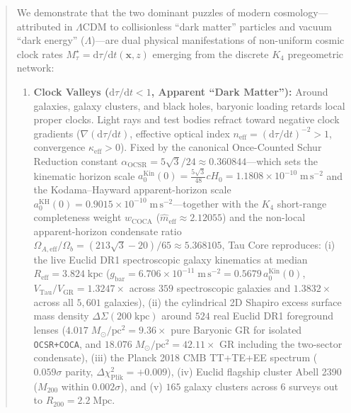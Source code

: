 \documentclass[11pt,a4paper]{article}
\begin{document}
\begin{abstract}
We demonstrate that the two dominant puzzles of modern cosmology---attributed in $\Lambda\mathrm{CDM}$ to collisionless ``dark matter'' particles and vacuum ``dark energy'' ($\Lambda$)---are dual physical manifestations of non-uniform cosmic clock rates $M_\tau^\star = \mathrm{d}\tau/\mathrm{d}t(\mathbf{x}, z)$ emerging from the discrete $K_4$ pregeometric network:
\begin{enumerate}
  \item \textbf{Clock Valleys ($\mathrm{d}\tau/\mathrm{d}t < 1$, Apparent ``Dark Matter''):} Around galaxies, galaxy clusters, and black holes, baryonic loading retards local proper clocks. Light rays and test bodies refract toward negative clock gradients ($\nabla(\mathrm{d}\tau/\mathrm{d}t)$, effective optical index $n_{\mathrm{eff}} = (\mathrm{d}\tau/\mathrm{d}t)^{-2} > 1$, convergence $\kappa_{\mathrm{eff}} > 0$). Fixed by the canonical Once-Counted Schur Reduction constant $\alpha_{\mathrm{OCSR}} = 5\sqrt{3}/24 \approx 0.360844$---which sets the kinematic horizon scale $a_0^{\mathrm{Kin}}(0) = \frac{5\sqrt{3}}{48} c H_0 = 1.1808 \times 10^{-10}\;\mathrm{m\,s^{-2}}$ and the Kodama--Hayward apparent-horizon scale $a_0^{\mathrm{KH}}(0) = 0.9015 \times 10^{-10}\;\mathrm{m\,s^{-2}}$---together with the $K_4$ short-range completeness weight $w_{\mathrm{COCA}}$ ($\hat{m}_{\mathrm{eff}} \approx 2.12055$) and the non-local apparent-horizon condensate ratio $\Omega_{A,\mathrm{eff}}/\Omega_b = (213\sqrt{3}-20)/65 \approx 5.368105$, Tau Core reproduces: (i) the live Euclid DR1 spectroscopic galaxy kinematics at median $R_{\mathrm{eff}} = 3.824\;\mathrm{kpc}$ ($g_{\mathrm{bar}} = 6.706\times 10^{-11}\;\mathrm{m\,s^{-2}} = 0.5679\,a_0^{\mathrm{Kin}}(0)$, $V_{\mathrm{Tau}}/V_{\mathrm{GR}} = 1.3247\times$ across $359$ spectroscopic galaxies and $1.3832\times$ across all $5,601$ galaxies), (ii) the cylindrical 2D Shapiro excess surface mass density $\Delta\Sigma(200\;\mathrm{kpc})$ around $524$ real Euclid DR1 foreground lenses ($4.017\;M_\odot/\mathrm{pc}^2 = 9.36\times$ pure Baryonic GR for isolated \texttt{OCSR+COCA}, and $18.076\;M_\odot/\mathrm{pc}^2 = 42.11\times$ GR including the two-sector condensate), (iii) the Planck 2018 CMB TT+TE+EE spectrum ($0.059\sigma$ parity, $\Delta\chi^2_{\mathrm{Plik}} = +0.009$), (iv) Euclid flagship cluster Abell 2390 ($M_{200}$ within $0.002\sigma$), and (v) $165$ galaxy clusters across $6$ surveys out to $R_{200} = 2.2\;\mathrm{Mpc}$.

\end{enumerate}
\end{abstract}
\end{document}
